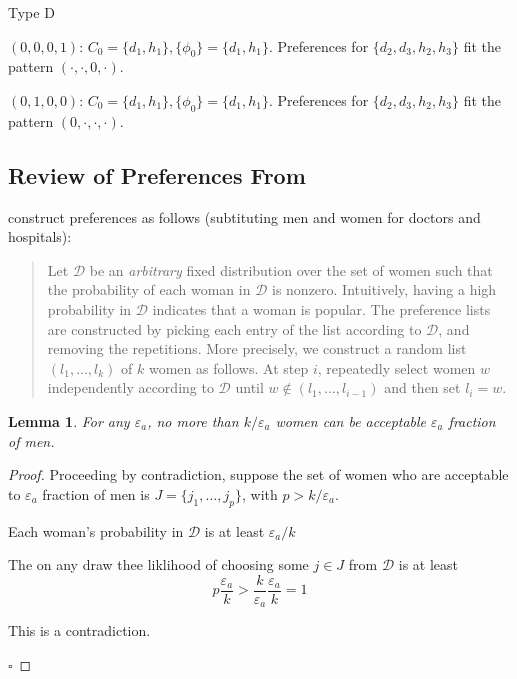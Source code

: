 \documentclass[WP]{AEA}
\newtheorem{lemma}{Lemma}
\begin{document}
Type D

$(0,0,0,1)$:  $C_0 =\{d_1,h_1\}, \{\phi_0\}=\{d_1,h_1\}$.  Preferences for $\{d_2,d_3,h_2,h_3\}$ fit the pattern $(\cdot,\cdot,0,\cdot)$.


$(0,1,0,0)$:  $C_0 =\{d_1,h_1\}, \{\phi_0\}=\{d_1,h_1\}$.  Preferences for $\{d_2,d_3,h_2,h_3\}$ fit the pattern $(0,\cdot,\cdot,\cdot)$.

\subsection{Review of Preferences From \cite{Immorlica2005}} \label{appendix:immorlica_pref}

\cite{Immorlica2005} construct preferences as follows (subtituting men and women for doctors and hospitals):
\begin{quote}
	Let $\mathcal{D}$ be an \emph{arbitrary} fixed distribution over the set of women such that the probability of each woman in 
	$\mathcal{D}$ is nonzero. Intuitively, having a high probability in $\mathcal{D}$ indicates that a woman is popular. 
	The preference lists are constructed by picking each entry of the list according to $\mathcal{D}$, and removing the repetitions. More precisely, we construct a random list $(l_1, ..., l_k)$
	of $k$ women as follows. At step $i$, repeatedly select women $w$ independently according to $\mathcal{D}$ until $w \notin (l_1, ..., l_{i-1})$ and then set $l_i = w$.
\end{quote}

\begin{lemma}
	For any $\varepsilon_a$, no more than $k/\varepsilon_a$ women can be acceptable $\varepsilon_a$ fraction of men.
\end{lemma}
\begin{proof}
	Proceeding by contradiction, suppose the set of women who are acceptable to $\varepsilon_a$ fraction of men is $J = \{j_1,..., j_p\}$, with $p > k/\varepsilon_a$. 

	Each woman's probability in $\mathcal{D}$ is at least $\varepsilon_a/k$

	The on any draw thee liklihood of choosing some $j\in J$ from $\mathcal{D}$ is at least $$p \frac{\varepsilon_a}{k} > \frac{k}{\varepsilon_a}\frac{\varepsilon_a}{k} = 1$$

	This is a contradiction.

	$\square$


\end{proof}
\end{document}
